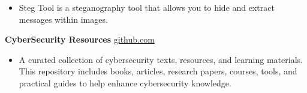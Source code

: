 \documentclass[10pt, letterpaper]{article}
\newenvironment{highlights}{
    \begin{itemize}[
        topsep=0.10 cm,
        parsep=0.10 cm,
        partopsep=0pt,
        itemsep=0pt,
        leftmargin=0 cm + 10pt
    ]
}{
    \end{itemize}
} %
\newenvironment{twocolentry}[2][]{
    \onecolentry
    \def\secondColumn{#2}
    \setcolumnwidth{\fill, 4.5 cm}
    \begin{paracol}{2}
}{
    \switchcolumn \raggedleft \secondColumn
    \end{paracol}
    \endonecolentry
} %
\begin{document}
        \vspace{0.10 cm}
        
            \begin{highlights}
                \item Steg Tool is a steganography tool that allows you to hide and extract messages within images.
            \end{highlights}

        \vspace{0.10 cm}

        
            \begin{twocolentry}{
            \href{https://github.com/TimsTittus/CyberSecurity-Texts-Resources}{github.com}
        }
            \textbf{CyberSecurity Resources}\end{twocolentry}

        \vspace{0.10 cm}
        
            \begin{highlights}
                \item A curated collection of cybersecurity texts, resources, and learning materials. This repository includes books, articles, research papers, courses, tools, and practical guides to help enhance cybersecurity knowledge.
            \end{highlights}
\end{document}

